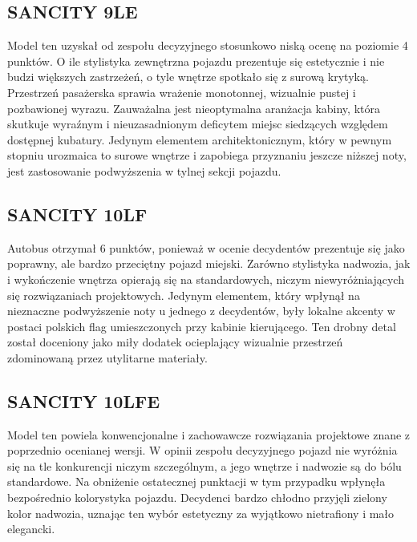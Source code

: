 \subsection{SANCITY 9LE}
Model ten uzyskał od zespołu decyzyjnego stosunkowo niską ocenę na poziomie 4 punktów. O ile stylistyka zewnętrzna pojazdu prezentuje się estetycznie i nie budzi większych zastrzeżeń, o tyle wnętrze spotkało się z surową krytyką. Przestrzeń pasażerska sprawia wrażenie monotonnej, wizualnie pustej i pozbawionej wyrazu. Zauważalna jest nieoptymalna aranżacja kabiny, która skutkuje wyraźnym i nieuzasadnionym deficytem miejsc siedzących względem dostępnej kubatury. Jedynym elementem architektonicznym, który w pewnym stopniu urozmaica to surowe wnętrze i zapobiega przyznaniu jeszcze niższej noty, jest zastosowanie podwyższenia w tylnej sekcji pojazdu.

\subsection{SANCITY 10LF}
Autobus otrzymał 6 punktów, ponieważ w ocenie decydentów prezentuje się jako poprawny, ale bardzo przeciętny pojazd miejski. Zarówno stylistyka nadwozia, jak i wykończenie wnętrza opierają się na standardowych, niczym niewyróżniających się rozwiązaniach projektowych. Jedynym elementem, który wpłynął na nieznaczne podwyższenie noty u jednego z decydentów, były lokalne akcenty w postaci polskich flag umieszczonych przy kabinie kierującego. Ten drobny detal został doceniony jako miły dodatek ocieplający wizualnie przestrzeń zdominowaną przez utylitarne materiały.

\subsection{SANCITY 10LFE}
Model ten powiela konwencjonalne i zachowawcze rozwiązania projektowe znane z poprzednio ocenianej wersji. W opinii zespołu decyzyjnego pojazd nie wyróżnia się na tle konkurencji niczym szczególnym, a jego wnętrze i nadwozie są do bólu standardowe. Na obniżenie ostatecznej punktacji w tym przypadku wpłynęła bezpośrednio kolorystyka pojazdu. Decydenci bardzo chłodno przyjęli zielony kolor nadwozia, uznając ten wybór estetyczny za wyjątkowo nietrafiony i mało elegancki.

